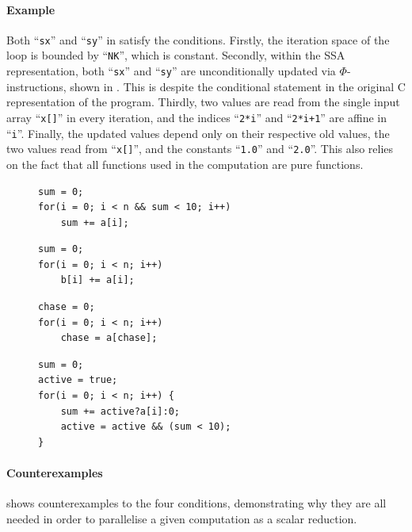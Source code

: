     \paragraph*{Example}
    Both ``{\tt sx}'' and ``{\tt sy}'' in 
    satisfy the conditions.
    Firstly, the iteration space of the loop is bounded by ``{\tt NK}'', which
    is constant.
    Secondly, within the SSA representation, both ``{\tt sx}'' and ``{\tt sy}''
    are unconditionally updated via $\Phi$-instructions, shown
    in .
    This is despite the conditional statement in the original C representation
    of the program.
    Thirdly, two values are read from the single input array ``{\tt x[]}'' in
    every iteration, and the indices ``{\tt 2*i}'' and ``{\tt 2*i+1}'' are
    affine in ``{\tt i}''.
    Finally, the updated values depend only on their respective old values,
    the two values read from ``{\tt x[]}'', and the constants
    ``{\tt 1.0}'' and ``{\tt 2.0}''.
    This also relies on the fact that all functions used in the computation are
    pure functions.

\begin{figure}[t]
\begin{lstlisting}[language=MyCpp]
sum = 0;
for(i = 0; i < n && sum < 10; i++)
    sum += a[i];
\end{lstlisting}
\begin{lstlisting}[language=MyCpp]
sum = 0;
for(i = 0; i < n; i++)
    b[i] += a[i];
\end{lstlisting}
\begin{lstlisting}[language=MyCpp]
chase = 0;
for(i = 0; i < n; i++)
    chase = a[chase];
\end{lstlisting}
\begin{lstlisting}[language=MyCpp,label={counterexamples},caption=
   {Counterexamples to the four conditions: None of these computations can be
    parallelised as scalar reductions.
    The first and last example implement the same program.}]
sum = 0;
active = true;
for(i = 0; i < n; i++) {
    sum += active?a[i]:0;
    active = active && (sum < 10);
}
\end{lstlisting}
\end{figure}

    \paragraph*{Counterexamples}
     shows counterexamples to the four conditions,
    demonstrating why they are all needed in order to parallelise a given
    computation as a scalar reduction.


